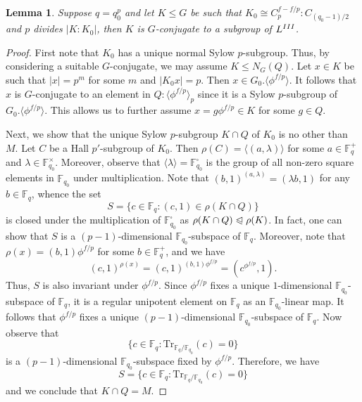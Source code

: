 \documentclass[twoside,a4paper,reqno,11pt]{amsart}
\newcommand{\normeq}{\trianglelefteqslant}
\newcommand{\<}{\langle}
\renewcommand{\>}{\rangle}
\newcommand{\la}{\langle}
\newcommand{\ra}{\rangle}
\newcommand{\leqs}{\leqslant}
\newcommand{\Tr}{\mathrm{Tr}}
\newtheorem{lem}[thm]{Lemma}
\theoremstyle{definition}
\begin{document}
	
	
	\begin{lem}
		\label{l:PSL2_d_III_rem}
		Suppose $q = q_0^p$ and let $K\leqs G$ be such that $K_0\cong C_p^{f-f/p}{:}C_{(q_0-1)/2}$ and $p$ divides $|K:K_0|$, then $K$ is $G$-conjugate to a subgroup of $L^{\rm III}$.
	\end{lem}
	
	\begin{proof}
		First note that $K_0$ has a unique normal Sylow $p$-subgroup. Thus, by considering a suitable $G$-conjugate, we may assume $K\leqs N_G(Q)$. Let $x\in K$ be such that $|x| = p^m$ for some $m$ and $|K_0x| = p$. Then $x\in G_0.\la\phi^{f/p}\ra$. It follows that $x$ is $G$-conjugate to an element in $Q{:}\la\phi^{f/p}\ra_p$ since it is a Sylow $p$-subgroup of $G_0.\la\phi^{f/p}\ra$. This allows us to further assume $x = g\phi^{f/p}\in K$ for some $g\in Q$.
		
		Next, we show that the unique Sylow $p$-subgroup $K\cap Q$ of $K_0$ is no other than $M$. Let $C$ be a Hall $p'$-subgroup of $K_0$. Then $\rho(C) = \la (a,\lambda)\ra$ for some $a\in\mathbb{F}_q^+$ and $\lambda\in\mathbb{F}_{q_0}^\times$. Moreover, observe that $\la\lambda\ra = \mathbb{F}_{q_0}^\square$ is the group of all non-zero square elements in $\mathbb{F}_{q_0}$ under multiplication. Note that $(b,1)^{(a,\lambda)} = (\lambda b,1)$ for any $b\in\mathbb{F}_q$, whence the set
		\begin{equation*}
		S = \{c\in\mathbb{F}_q : (c,1)\in\rho(K\cap Q)\}
		\end{equation*}
		is closed under the multiplication of $\mathbb{F}_{q_0}^\square$ as $\rho(K\cap Q)\normeq \rho(K)$. In fact, one can show that $S$ is a $(p-1)$-dimensional $\mathbb{F}_{q_0}$-subspace of $\mathbb{F}_q$. Moreover, note that $\rho(x) = (b,1)\phi^{f/p}$ for some $b\in\mathbb{F}_q^+$, and we have
		\begin{equation*}
		(c,1)^{\rho(x)} = (c,1)^{(b,1)\phi^{f/p}} = (c^{\phi^{f/p}},1).
		\end{equation*}
		Thus, $S$ is also invariant under $\phi^{f/p}$. Since $\phi^{f/p}$ fixes a unique $1$-dimensional $\mathbb{F}_{q_0}$-subspace of $\mathbb{F}_q$, it is a regular unipotent element on $\mathbb{F}_q$ as an $\mathbb{F}_{q_0}$-linear map. It follows that $\phi^{f/p}$ fixes a unique $(p-1)$-dimensional $\mathbb{F}_{q_0}$-subspace of $\mathbb{F}_q$. Now observe that
		\begin{equation*}
		\{c\in\mathbb{F}_q : \Tr_{\mathbb{F}_q/\mathbb{F}_{q_0}}(c) = 0\}
		\end{equation*}
		is a $(p-1)$-dimensional $\mathbb{F}_{q_0}$-subspace fixed by $\phi^{f/p}$. Therefore, we have
		\begin{equation*}
		S = \{c\in\mathbb{F}_q : \Tr_{\mathbb{F}_q/\mathbb{F}_{q_0}}(c) = 0\}
		\end{equation*}
		and we conclude that $K\cap Q = M$.
		

\end{proof}
\end{document}
